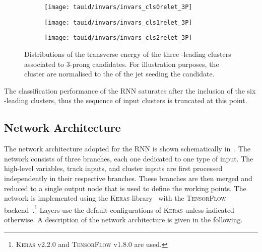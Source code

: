 \begin{figure}[htbp]
  \centering

  \begin{subfigure}{0.33\textwidth}
    \texttt{[image: tauid/invars/invars\_cls0relet\_3P]}
    \subcaption{}%
    \label{fig:tauid_low_level_variables_cluster0}
  \end{subfigure}%
  \begin{subfigure}{0.33\textwidth}
    \texttt{[image: tauid/invars/invars\_cls1relet\_3P]}
    \subcaption{}%
    \label{fig:tauid_low_level_variables_cluster1}
  \end{subfigure}%
  \begin{subfigure}{0.33\textwidth}
    \texttt{[image: tauid/invars/invars\_cls2relet\_3P]}
    \subcaption{}%
    \label{fig:tauid_low_level_variables_cluster2}
  \end{subfigure}

  \caption{Distributions of the transverse energy of the three
    \ET-leading clusters associated to 3-prong \tauhadvis
    candidates. For illustration purposes, the cluster \ET are
    normalised to the \pT of the jet seeding the \tauhadvis
    candidate.}%
  \label{fig:tauid_low_level_variables_cluster}
\end{figure}

The classification performance of the RNN \tauid saturates after the
inclusion of the six \ET-leading clusters, thus the sequence of input
clusters is truncated at this point.


\subsection{Network Architecture}

The network architecture adopted for the RNN \tauid is shown
schematically in~. The network
consists of three branches, each one dedicated to one type of
input. The high-level variables, track inputs, and cluster inputs are
first processed independently in their respective branches. These
branches are then merged and reduced to a single output node that is
used to define the \tauid working points. The network is implemented
using the \textsc{Keras} library~\cite{keras} with the
\textsc{TensorFlow}
backend~\cite{tensorflow2015-whitepaper}.\footnote{\textsc{Keras}
  v2.2.0 and \textsc{TensorFlow} v1.8.0 are used.} Layers use the
default configurations of \textsc{Keras} unless indicated otherwise. A
description of the network architecture is given in the following.

